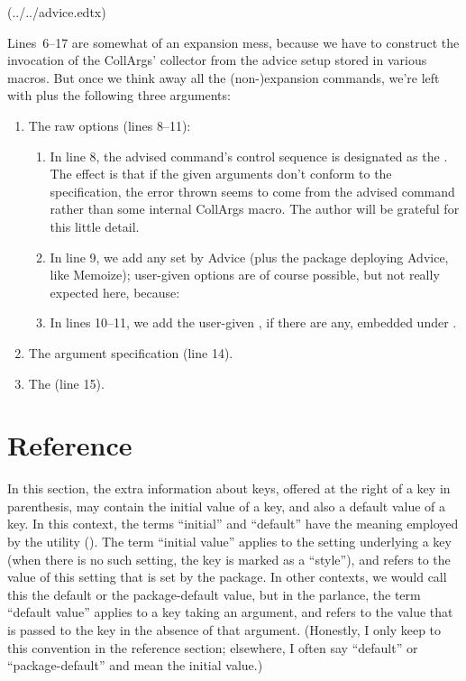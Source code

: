 \documentclass[a4paper,11pt]{article}
\begin{document}
(../../advice.edtx)

Lines~6--17 are somewhat of an expansion mess, because we have to construct the
invocation of the CollArgs' collector from the advice setup stored in various
macros.  But once we think away all the (non-)expansion commands, we're left
with  plus the following three arguments:
\begin{enumerate}
\item The raw options (lines 8--11):
  \begin{enumerate}
  \item In line 8, the advised command's control sequence is designated as the
    .  The effect is that if the given arguments don't
    conform to the specification, the error thrown seems to come from the
    advised command rather than some internal CollArgs macro.  The author will
    be grateful for this little detail.
  \item In line 9, we add any  set by Advice
    (plus the package deploying Advice, like Memoize); user-given options are of
    course possible, but not really expected here, because:
  \item In lines 10--11, we add the user-given ,
    if there are any, embedded under .
  \end{enumerate}
\item The argument specification (line 14).
\item The  (line 15).
\end{enumerate}



\section{Reference}
\label{sec:reference}

In this section, the extra information about keys, offered at the right of a
key in parenthesis, may contain the initial value of a key, and also a default
value of a key.  In this context, the terms ``initial'' and ``default'' have
the meaning employed by the  utility ().  The term
``initial value'' applies to the setting underlying a key (when there is no
such setting, the key is marked as a ``style''), and refers to the value of
this setting that is set by the package.  In other contexts, we would call this
the default or the package-default value, but in the  parlance,
the term ``default value'' applies to a key taking an argument, and refers to
the value that is passed to the key in the absence of that argument.
(Honestly, I only keep to this convention in the reference section; elsewhere,
I often say ``default'' or ``package-default'' and mean the initial value.)
\end{document}
